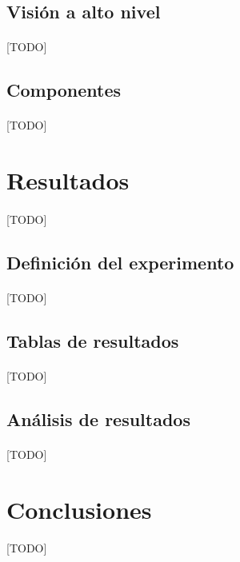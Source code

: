 \documentclass{subfiles}
\begin{document}
      \subsection{Visión a alto nivel}
      \label{sec:implementation_high_level_vision}

        \paragraph{}
        [TODO]

      \subsection{Componentes}
      \label{sec:implementation_components}

        \paragraph{}
        [TODO]

    \section{Resultados}
    \label{sec:results}

      \paragraph{}
      [TODO]

      \subsection{Definición del experimento}
      \label{sec:results_definition}

        \paragraph{}
        [TODO]

      \subsection{Tablas de resultados}
      \label{sec:results_tables}

        \paragraph{}
        [TODO]

      \subsection{Análisis de resultados}
      \label{sec:results_analysis}

        \paragraph{}
        [TODO]

    \section{Conclusiones}
    \label{sec:implementation_results_conclusions}

      \paragraph{}
      [TODO]
\end{document}
